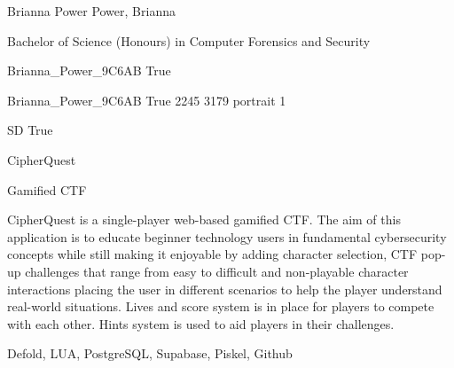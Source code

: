 \documentclass[twoside]{report}
\begin{document}
\begingroup{}\relax



\def\Key{Brianna_Power_9C6AB}

{Brianna Power}
{Power, Brianna}

{Bachelor of Science (Honours) in Computer Forensics and Security}

{Brianna_Power_9C6AB}
{True}

{Brianna_Power_9C6AB}
{True}
{2245}
{3179}
{portrait}
{1}

{SD}
{True}

{CipherQuest}

{Gamified CTF}

{CipherQuest is a single-player web-based gamified CTF.
The aim of this application is to educate beginner technology users in fundamental cybersecurity concepts while still making it enjoyable by adding character selection, CTF pop-up challenges that range from easy to difficult and non-playable character interactions placing the user in different scenarios to help the player understand real-world situations.
Lives and score system is in place for players to compete with each other. Hints system is used to aid players in their challenges.}

{Defold, LUA, PostgreSQL, Supabase, Piskel, Github}
\end{document}
